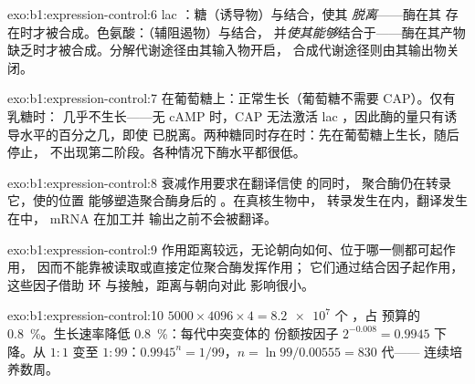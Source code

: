 \begin{solution}{exo:b1:expression-control:6}
lac ：糖（诱导物）与结合，使其
\emph{脱离}——酶在其
存在时才被合成。色氨酸：（辅阻遏物）与结合，
并\emph{使其能够}结合于——酶在其产物
缺乏时才被合成。分解代谢途径由其输入物开启，
合成代谢途径则由其输出物关闭。
\end{solution}

\begin{solution}{exo:b1:expression-control:7}
在葡萄糖上：正常生长（葡萄糖不需要 CAP）。仅有乳糖时：
几乎不生长——无 cAMP 时，CAP 无法激活 lac
，因此酶的量只有诱导水平的百分之几，即使
已脱离。两种糖同时存在时：先在葡萄糖上生长，随后停止，
不出现第二阶段。各种情况下酶水平都很低。
\end{solution}

\begin{solution}{exo:b1:expression-control:8}
衰减作用要求在翻译信使  的同时，
聚合酶仍在转录它，使的位置
能够塑造聚合酶身后的 。在真核生物中，
转录发生在内，翻译发生在中，
mRNA 在加工并
输出之前不会被翻译。
\end{solution}

\begin{solution}{exo:b1:expression-control:9}
作用距离较远，无论朝向如何、位于哪一侧都可起作用，
因而不能靠被读取或直接定位聚合酶发挥作用；
它们通过结合因子起作用，这些因子借助  环
与接触，距离与朝向对此
影响很小。
\end{solution}

\begin{solution}{exo:b1:expression-control:10}
$5000\times 4096\times 4 = \num{8.2e7}$ 个 ，占
预算的 \qty{0.8}{\%}。生长速率降低 \qty{0.8}{\%}：每代中突变体的
份额按因子 $2^{-0.008} = 0.9945$ 下降。从 $1:1$ 变至
$1:99$：$0.9945^n = 1/99$，$n = \ln 99/0.00555 = 830$ 代——
连续培养数周。
\end{solution}


